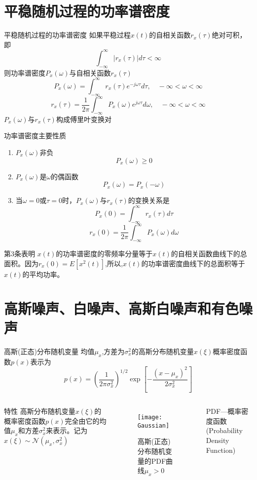 \section{平稳随机过程的功率谱密度}

\begin{frame}{平稳随机过程的功率谱密度}
如果平稳过程$x(t)$的自相关函数$r_x(\tau)$绝对可积，即
$$\int_{-\infty}^{\infty}|r_x(\tau)|d\tau <\infty$$
则功率谱密度$P_x(\omega)$与自相关函数$r_x(\tau)$
$$P_x(\omega)=\int_{-\infty}^{\infty}r_x(\tau)e^{-j\omega\tau}d\tau,\quad -\infty<\omega<\infty$$
$$r_x(\tau)=\frac{1}{2\pi}\int_{-\infty}^{\infty}P_x(\omega)e^{j\omega\tau}d\omega,\quad -\infty<\omega<\infty$$
$P_x(\omega)$与$r_x(\tau)$构成傅里叶变换对
\end{frame}

\begin{frame}{功率谱密度主要性质}
\begin{enumerate}
	\item $P_x(\omega)$非负
			$$P_x(\omega)\ge 0$$
	\item $P_x(\omega)$是$\omega$的偶函数
			$$P_x(\omega) = P_x(-\omega)$$
	\item 当$\omega=0$或$\tau=0$时，$P_x(\omega)$与$r_x(\tau)$的变换关系是
			$$P_x(0)=\int_{-\infty}^{\infty}r_x(\tau)d\tau$$
			$$r_x(0)=\frac{1}{2\pi}\int_{-\infty}^{\infty}P_x(\omega)d\omega$$	
\end{enumerate}
\begin{block}{第3条表明}
	$x(t)$的功率谱密度的零频率分量等于$x(t)$的自相关函数曲线下的总面积。因为$r_x(0)=E[x^2(t)]$,所以,$x(t)$的功率谱密度曲线下的总面积等于$x(t)$的平均功率。
\end{block}
\end{frame}

\section{高斯噪声、白噪声、高斯白噪声和有色噪声}

\begin{frame}{高斯(正态)分布随机变量}
均值$\mu_x$,方差为$\sigma_x^2$的高斯分布随机变量$x(\xi)$概率密度函数$p(x)$表示为
\[p(x)=\left(\frac{1}{2\pi\sigma_x^2}\right)^{1/2}\exp\left[-\frac{(x-\mu_x)^2}{2\sigma_x^2}\right] \]
\begin{columns}
	\begin{block}{特性}
		高斯分布随机变量$x(\xi)$的概率密度函数$p(x)$完全由它的均值$\mu_x$和方差$\sigma_x^2$来表示。记为$x(\xi)\sim\mathcal{N}(\mu_x,\sigma_x^2)$
	\end{block}
	\begin{figure}[!h]
		\centering
		\texttt{[image: Gaussian]}
		\caption{高斯(正态)分布随机变量的PDF曲线$\mu_x>0$}
	\end{figure}
    \tiny PDF---概率密度函数(Probability Density Function)
\end{columns}
\end{frame}

